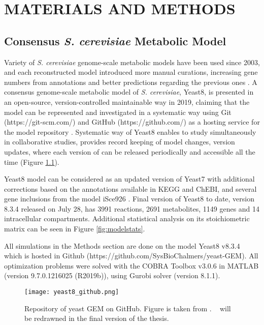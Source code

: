 \chapter{MATERIALS AND METHODS}

\section{Consensus \emph{S. cerevisiae} Metabolic Model}
Variety of \emph{S. cerevisiae} genome-scale metabolic models have been used since 2003, and each reconstructed model introduced more manual curations, increasing gene numbers from annotations and better predictions regarding the previous ones \cite{lopes2017genome}. A consensus genome-scale metabolic model of \emph{S. cerevisiae}, Yeast8, is presented in an open-source, version-controlled maintainable way in 2019, claiming that the model can be represented and investigated in a systematic way using Git (https://git-scm.com/) and GitHub (https://github.com/) as a hosting service for the model repository \cite{lu2019consensus}. Systematic way of Yeast8 enables to study simultaneously in collaborative studies, provides record keeping of model changes, version updates, where each version of can be released periodically and accessible all the time (Figure \ref{fig:yeast8_github}).

Yeast8 model can be considered as an updated version of Yeast7 \cite{aung2013revising} with additional corrections based on the annotations available in KEGG and ChEBI, and several gene inclusions from the model iSce926 \cite{chowdhury2015using}. Final version of Yeast8 to date, version 8.3.4 released on July 28, has 3991 reactions, 2691 metabolites, 1149 genes and 14 intracellular compartments. Additional statistical analysis on its stoichiometric matrix can be seen in Figure \ref{fig:modelstats}.

All simulations in the Methods section are done on the model Yeast8 v8.3.4 which is hosted in Github (https://github.com/SysBioChalmers/yeast-GEM). All optimization problems were solved with the COBRA Toolbox v3.0.6 in MATLAB (version 9.7.0.1216025 (R2019b)), using Gurobi solver (version 8.1.1).

\begin{figure}[H]
\begin{center}
\texttt{[image: yeast8\_github.png]}
\end{center}
\caption[Repository of yeast GEM on GitHub]{Repository of yeast GEM on GitHub. Figure is taken from \cite{lu2019consensus}. ~ will be redrawned in the final version of the thesis.}
\label{fig:yeast8_github}
\end{figure}

